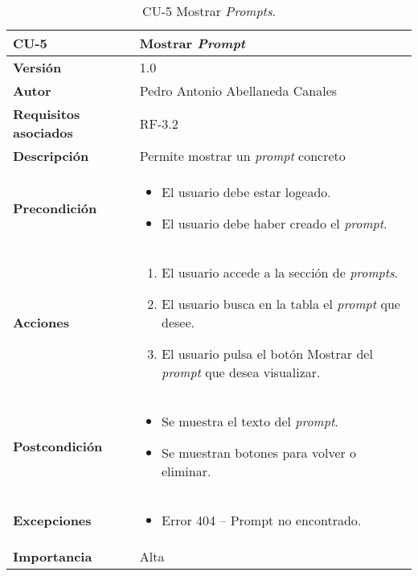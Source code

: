 \begin{table}[p]
	\centering
	\begin{tabularx}{\linewidth}{ p{} p{} }
		\toprule
		\textbf{CU-5}    & \textbf{Mostrar \textit{Prompt}} \\
		\midrule
		\textbf{Versión}              & 1.0    \\
		\textbf{Autor}                & Pedro Antonio Abellaneda Canales \\
		\textbf{Requisitos asociados} & RF-3.2 \\
		\textbf{Descripción}          & Permite mostrar un \textit{prompt} concreto \\
		\textbf{Precondición}         
                                    & 
                                    \begin{itemize}
                                        \tightlist
                                        \item El usuario debe estar logeado.
                                        \item  El usuario debe haber creado el \textit{prompt}.
                                    \end{itemize}  
                                    \\
		\textbf{Acciones}             &
		\begin{enumerate}
			\def\labelenumi{\arabic{enumi}.}
			\tightlist
			\item El usuario accede a la sección de \textit{prompts}.
            \item El usuario busca en la tabla el \textit{prompt} que desee.
			\item El usuario pulsa el botón Mostrar del \textit{prompt} que desea visualizar.
		\end{enumerate} \\
		\textbf{Postcondición}        
                                & 
                                \begin{itemize} 
                                    \tightlist
                                    \item Se muestra el texto del \textit{prompt}.
                                    \item Se muestran botones para volver o eliminar.
                                \end{itemize}  
                                \\ 
		\textbf{Excepciones}          
        & 
                                        \begin{itemize}
                                        \tightlist
                                            \item Error 404 – Prompt no encontrado.
                                        \end{itemize}  
                                        \\ 
		\textbf{Importancia}          & Alta \\
		\bottomrule
	\end{tabularx}
	\caption{CU-5 Mostrar \textit{Prompts}.}
	\label{tab:CU-5}
\end{table}


